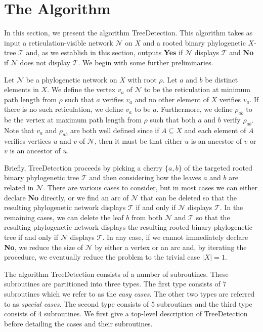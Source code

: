 \documentclass[11pt]{amsart}
\begin{document}
\section{The Algorithm}
\label{algorithm}

In this section, we present the algorithm {\sc TreeDetection}. This algorithm takes as input a reticulation-visible network ${{\mathcal N}}$ on $X$ and a rooted binary phylogenetic $X$-tree ${{\mathcal T}}$ and, as we establish in this section, outputs {\bf Yes} if ${{\mathcal N}}$ displays ${{\mathcal T}}$ and {\bf No} if ${{\mathcal N}}$ does not display ${{\mathcal T}}$. We begin with some further preliminaries.

Let ${{\mathcal N}}$ be a phylogenetic network on $X$ with root $\rho$. Let $a$ and $b$ be distinct elements in $X$. We define the vertex $v_a$ of ${{\mathcal N}}$ to be the reticulation at minimum path length from $\rho$ such that $a$ verifies $v_a$ and no other element of $X$ verifies $v_a$. If there is no such reticulation, we define $v_a$ to be $a$. Furthermore, we define $\rho_{ab}$ to be the vertex at maximum path length from $\rho$ such that both $a$ and $b$ verify $\rho_{ab}$. Note that $v_a$ and $\rho_{ab}$ are both well defined since if $A\subseteq X$ and each element of $A$ verifies vertices $u$ and $v$ of ${{\mathcal N}}$, then it must be that either $u$ is an ancestor of $v$ or $v$ is an ancestor of $u$.

Briefly, {\sc TreeDetection} proceeds by picking a cherry $\{a, b\}$ of the targeted rooted binary phylogenetic tree ${{\mathcal T}}$ and then considering how the leaves $a$ and $b$ are related in ${{\mathcal N}}$. There are various cases to consider, but in most cases we can either declare \textbf{No} directly, or we find an arc of ${{\mathcal N}}$ that can be deleted so that the resulting phylogenetic network displays ${{\mathcal T}}$ if and only if ${{\mathcal N}}$ displays ${{\mathcal T}}$. In the remaining cases, we can delete the leaf $b$ from both ${{\mathcal N}}$ and ${{\mathcal T}}$ so that the resulting phylogenetic network displays the resulting rooted binary phylogenetic tree if and only if ${{\mathcal N}}$ displays ${{\mathcal T}}$. In any case, if we cannot immediately declare \textbf{No}, we reduce the size of ${{\mathcal N}}$ by either a vertex or an arc and, by iterating the procedure, we eventually reduce the problem to the trivial case $|X|=1$.

The algorithm {\sc TreeDetection} consists of a number of subroutines. These subroutines are partitioned into three types. The first type consists of $7$ subroutines which we refer to as the {\em easy cases}. The other two types are referred to as {\em special cases}. The second type consists of $5$ subroutines and the third type consists of $4$ subroutines. We first give a top-level description of {\sc TreeDetection} before detailing the cases and their subroutines.
\end{document}

